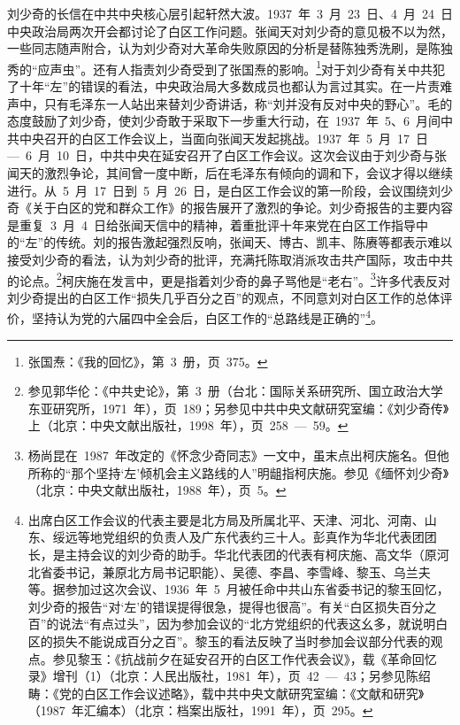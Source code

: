 刘少奇的长信在中共中央核心层引起轩然大波。1937~年~3~月~23~日、4~月~24~日中央政治局两次开会都讨论了白区工作问题。张闻天对刘少奇的意见极不以为然，一些同志随声附合，认为刘少奇对大革命失败原因的分析是替陈独秀洗刷，是陈独秀的“应声虫”。还有人指责刘少奇受到了张国焘的影响。\footnote{张国焘：《我的回忆》，第~3~册，页~375。}对于刘少奇有关中共犯了十年“左”的错误的看法，中央政治局大多数成员也都认为言过其实。在一片责难声中，只有毛泽东一人站出来替刘少奇讲话，称“刘并没有反对中央的野心”。毛的态度鼓励了刘少奇，使刘少奇敢于采取下一步重大行动，在~1937~年~5、6~月间中共中央召开的白区工作会议上，当面向张闻天发起挑战。1937~年~5~月~17~日—~6~月~10~日，中共中央在延安召开了白区工作会议。这次会议由于刘少奇与张闻天的激烈争论，其间曾一度中断，后在毛泽东有倾向的调和下，会议才得以继续进行。从~5~月~17~日到~5~月~26~日，是白区工作会议的第一阶段，会议围绕刘少奇《关于白区的党和群众工作》的报告展开了激烈的争论。刘少奇报告的主要内容是重复~3~月~4~日给张闻天信中的精神，着重批评十年来党在白区工作指导中的“左”的传统。刘的报告激起强烈反响，张闻天、博古、凯丰、陈赓等都表示难以接受刘少奇的看法，认为刘少奇的批评，充满托陈取消派攻击共产国际，攻击中共的论点。\footnote{参见郭华伦：《中共史论》，第~3~册（台北：国际关系研究所、国立政治大学东亚研究所，1971~年），页~189；另参见中共中央文献研究室编：《刘少奇传》上（北京：中央文献出版社，1998~年），页~258~—~59。}柯庆施在发言中，更是指着刘少奇的鼻子骂他是“老右”。\footnote{杨尚昆在~1987~年改定的《怀念少奇同志》一文中，虽末点出柯庆施名。但他所称的“那个坚持‘左’倾机会主义路线的人”明龃指柯庆施。参见《缅怀刘少奇》（北京：中央文献出版社，1988~年），页~5。}许多代表反对刘少奇提出的白区工作“损失几乎百分之百”的观点，不同意刘对白区工作的总体评价，坚持认为党的六届四中全会后，白区工作的“总路线是正确的”\footnote{出席白区工作会议的代表主要是北方局及所属北平、天津、河北、河南、山东、绥远等地党组织的负责人及广东代表约三十人。彭真作为华北代表团团长，是主持会议的刘少奇的助手。华北代表团的代表有柯庆施、高文华（原河北省委书记，兼原北方局书记职能）、吴德、李昌、李雪峰、黎玉、乌兰夫等。据参加过这次会议、1936~年~5~月被任命中共山东省委书记的黎玉回忆，刘少奇的报告“对‘左’的错误提得很急，提得也很高”。有关“白区损失百分之百”的说法“有点过头”，因为参加会议的“北方党组织的代表这幺多，就说明白区的损失不能说成百分之百”。黎玉的看法反映了当时参加会议部分代表的观点。参见黎玉：《抗战前夕在延安召开的白区工作代表会议》，载《革命回忆录》增刊（1）（北京：人民出版社，1981~年），页~42~—~43；另参见陈绍畴：《党的白区工作会议述略》，载中共中央文献研究室编：《文献和研究》（1987~年汇编本）（北京：档案出版社，1991~年），页~295。}。

